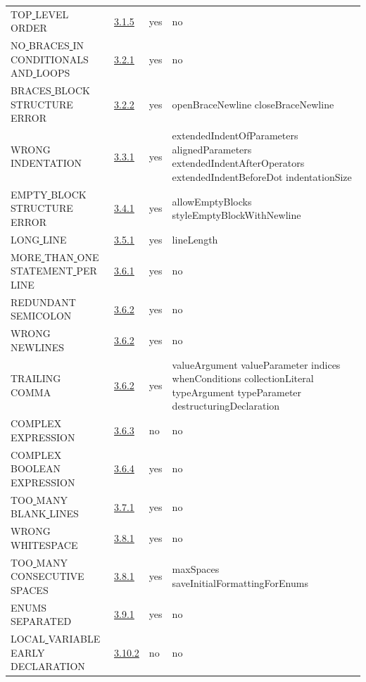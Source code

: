 \begin{longtable}{ |l|p{0.8cm}|p{0.8cm}| p{3cm} | }
TOP\underline{ }LEVEL\underline{ }ORDER & \hyperref[sec:3.1.5]{3.1.5} &  yes  &   no  \\
NO\underline{ }BRACES\underline{ }IN\underline{ }CONDITIONALS\underline{ }AND\underline{ }LOOPS & \hyperref[sec:3.2.1]{3.2.1} &  yes  &   no  \\
BRACES\underline{ }BLOCK\underline{ }STRUCTURE\underline{ }ERROR & \hyperref[sec:3.2.2]{3.2.2} &  yes  &   openBraceNewline closeBraceNewline  \\
WRONG\underline{ }INDENTATION & \hyperref[sec:3.3.1]{3.3.1} &  yes  &  extendedIndentOfParameters alignedParameters extendedIndentAfterOperators extendedIndentBeforeDot indentationSize   \\
EMPTY\underline{ }BLOCK\underline{ }STRUCTURE\underline{ }ERROR & \hyperref[sec:3.4.1]{3.4.1} &  yes  &   allowEmptyBlocks styleEmptyBlockWithNewline  \\
LONG\underline{ }LINE & \hyperref[sec:3.5.1]{3.5.1} &  yes  &   lineLength                 \\
MORE\underline{ }THAN\underline{ }ONE\underline{ }STATEMENT\underline{ }PER\underline{ }LINE & \hyperref[sec:3.6.1]{3.6.1} &  yes  &   no  \\
REDUNDANT\underline{ }SEMICOLON & \hyperref[sec:3.6.2]{3.6.2} &  yes  &   no  \\
WRONG\underline{ }NEWLINES & \hyperref[sec:3.6.2]{3.6.2} &  yes  &   no  \\
TRAILING\underline{ }COMMA & \hyperref[sec:3.6.2]{3.6.2} &  yes  &   valueArgument valueParameter indices whenConditions collectionLiteral typeArgument typeParameter destructuringDeclaration  \\
COMPLEX\underline{ }EXPRESSION & \hyperref[sec:3.6.3]{3.6.3} &  no  &   no  \\
COMPLEX\underline{ }BOOLEAN\underline{ }EXPRESSION & \hyperref[sec:3.6.4]{3.6.4} &  yes  &   no    \\
TOO\underline{ }MANY\underline{ }BLANK\underline{ }LINES & \hyperref[sec:3.7.1]{3.7.1} &  yes  &   no  \\
WRONG\underline{ }WHITESPACE & \hyperref[sec:3.8.1]{3.8.1} &  yes  &   no  \\
TOO\underline{ }MANY\underline{ }CONSECUTIVE\underline{ }SPACES & \hyperref[sec:3.8.1]{3.8.1} &  yes  &   maxSpaces saveInitialFormattingForEnums  \\
ENUMS\underline{ }SEPARATED & \hyperref[sec:3.9.1]{3.9.1} &  yes  &   no  \\
LOCAL\underline{ }VARIABLE\underline{ }EARLY\underline{ }DECLARATION & \hyperref[sec:3.10.2]{3.10.2} &  no  &   no  \\

\end{longtable}
